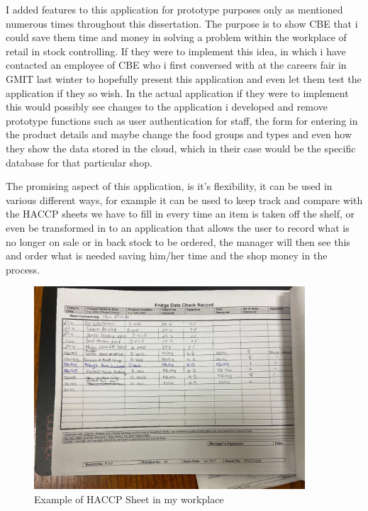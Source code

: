 I added features to this application for prototype purposes only as mentioned numerous times throughout this dissertation. The purpose is to show CBE that i could save them time and money in solving a problem within the workplace of retail in stock controlling. If they were to implement this idea, in which i have contacted an employee of CBE who i first conversed with at the careers fair in GMIT last winter to hopefully present this application and even let them test the application if they so wish. In the actual application if they were to implement this would possibly see changes to the application i developed and remove prototype functions such as user authentication for staff, the form for entering in the product details and maybe change the food groups and types and even how they show the data stored in the cloud, which in their case would be the specific database for that particular shop. 
\newline 

\newpage
The promising aspect of this application, is it's flexibility, it can be used in various different ways, for example it can be used to keep track and compare with the HACCP sheets we have to fill in every time an item is taken off the shelf, or even be transformed in to an application that allows the user to record what is no longer on sale or in back stock to be ordered, the manager will then see this and order what is needed saving him/her time and the shop money in the process.

\begin{figure}[h!]
	\caption{Example of HACCP Sheet in my workplace}
	\label{image:HACCP}
	\centering
	\includegraphics[width=0.9\textwidth]{images/HACCP.jpg}
\end{figure}

